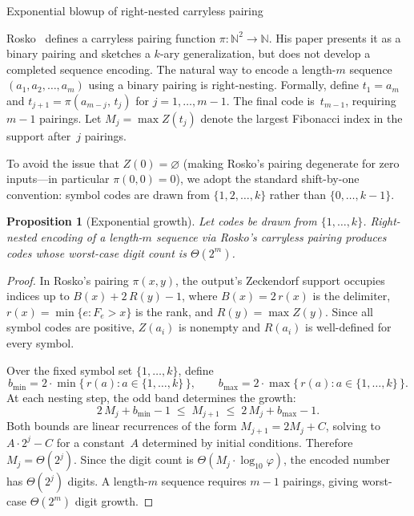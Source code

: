 \documentclass[11pt]{amsart}
\makeatletter
\renewcommand{\subsection}{\@startsection{subsection}{2}%
  \z@{.5\linespacing\@plus.7\linespacing}{-.5em}%
  {\normalfont\bfseries}}
\theoremstyle{plain}
\newtheorem{proposition}[theorem]{Proposition}
\theoremstyle{definition}
\theoremstyle{remark}
\makeatother
\begin{document}
\subsection{Exponential blowup of right-nested carryless pairing}\label{sec:blowup}

Rosko~\cite{Rosko2025} defines a carryless pairing function $\pi : \mathbb{N}^2 \to \mathbb{N}$. His paper presents it as a binary pairing and sketches a $k$-ary generalization, but does not develop a completed sequence encoding. The natural way to encode a length-$m$ sequence $(a_1, a_2, \ldots, a_m)$ using a binary pairing is right-nesting. Formally, define $t_1 = a_m$ and $t_{j+1} = \pi(a_{m-j},\, t_j)$ for $j = 1, \ldots, m-1$. The final code is~$t_{m-1}$, requiring $m-1$ pairings. Let $M_j = \max Z(t_j)$ denote the largest Fibonacci index in the support after~$j$ pairings.

To avoid the issue that $Z(0) = \varnothing$ (making Rosko's pairing degenerate for zero inputs---in particular $\pi(0,0)=0$), we adopt the standard shift-by-one convention: symbol codes are drawn from $\{1, 2, \ldots, k\}$ rather than $\{0,\ldots,k-1\}$.

\begin{proposition}[Exponential growth]\label{prop:blowup}
Let codes be drawn from $\{1,\ldots,k\}$. Right-nested encoding of a length-$m$ sequence via Rosko's carryless pairing produces codes whose worst-case digit count is $\Theta(2^m)$.
\end{proposition}

\begin{proof}
In Rosko's pairing $\pi(x,y)$, the output's Zeckendorf support occupies indices up to $B(x) + 2\,R(y) - 1$, where $B(x) = 2\,r(x)$ is the delimiter, $r(x) = \min\{e : F_e > x\}$ is the rank, and $R(y) = \max Z(y)$. Since all symbol codes are positive, $Z(a_i)$ is nonempty and $R(a_i)$ is well-defined for every symbol.

Over the fixed symbol set $\{1,\ldots,k\}$, define
\[
b_{\min} = 2 \cdot \min\bigl\{\, r(a) : a \in \{1,\ldots,k\} \,\bigr\}, \qquad
b_{\max} = 2 \cdot \max\bigl\{\, r(a) : a \in \{1,\ldots,k\} \,\bigr\}.
\]
At each nesting step, the odd band determines the growth:
\[
2\,M_j + b_{\min} - 1 \;\le\; M_{j+1} \;\le\; 2\,M_j + b_{\max} - 1.
\]
Both bounds are linear recurrences of the form $M_{j+1} = 2M_j + C$, solving to $A \cdot 2^j - C$ for a constant~$A$ determined by initial conditions. Therefore $M_j = \Theta(2^j)$. Since the digit count is $\Theta(M_j \cdot \log_{10}\varphi)$, the encoded number has $\Theta(2^j)$ digits. A length-$m$ sequence requires $m-1$ pairings, giving worst-case $\Theta(2^m)$ digit growth.
\end{proof}
\end{document}
